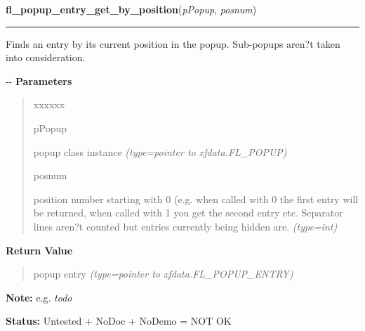     \vspace{0.5ex}

\hspace{.8\funcindent}\begin{boxedminipage}{\funcwidth}

    \raggedright \textbf{fl\_popup\_entry\_get\_by\_position}(\textit{pPopup}, \textit{posnum})

    \vspace{-1.5ex}

    \rule{\textwidth}{0.5\fboxrule}
\setlength{\parskip}{2ex}

Finds an entry by its current position in the popup. Sub-popups aren?t
taken into consideration.

-{}-
\setlength{\parskip}{1ex}
      \textbf{Parameters}
      \vspace{-1ex}

      \begin{quote}
        \begin{Ventry}{xxxxxx}

          \item[pPopup]


popup class instance
            {\it (type=pointer to xfdata.FL\_POPUP)}

          \item[posnum]


position number starting with 0 (e.g. when called with 0 the first
entry will be returned, when called with 1 you get the second entry
etc. Separator lines aren?t counted but entries currently being hidden
are.
            {\it (type=int)}

        \end{Ventry}

      \end{quote}

      \textbf{Return Value}
    \vspace{-1ex}

      \begin{quote}

popup entry
      {\it (type=pointer to xfdata.FL\_POPUP\_ENTRY)}

      \end{quote}

\textbf{Note:} 
e.g. \emph{todo}


\textbf{Status:} 
Untested + NoDoc + NoDemo = NOT OK


    \end{boxedminipage}

